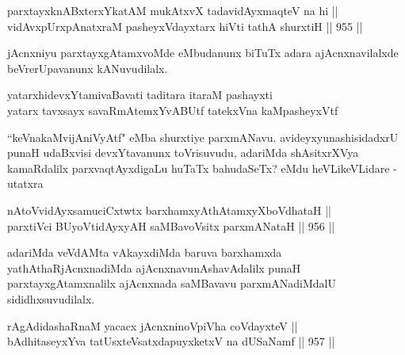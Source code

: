 \begin{shl}
parxtayxknABxterxYkatAM mukAtxvX tadavidAyxmaqteV na hi || \\
vidAvxpUrxpAnatxraM pasheyxVdayxtarx hiVti tathA shurxtiH \hfill || 955 ||  
\end{shl}

\begin{artha}
jAcnxniyu parxtayxgAtamxvoMde eMbudanunx biTuTx adara ajAcnxnavilalxde beVrerUpavanunx kANuvudilalx.
\end{artha}
	
\begin{shl}
yatarxhidevxYtamivaBavati taditara itaraM pashayxti \\
yatarx tavxsayx savaRmAtemxYvABUtf tatekxVna kaMpasheyxVtf
\end{shl}	
	
\begin{artha}
``keVnakaMvijAniVyAtf" eMba shurxtiye parxmANavu. avideyxyunashisidadxrU punaH udaBxvisi devxYtavanunx toVrisuvudu, adariMda shAsitxrXVya kamaRdalilx parxvaqtAyxdigaLu huTaTx bahudaSeTx? eMdu heVLikeVLidare - utatxra
\end{artha}

\begin{shl}
nAtoV\s vidAyxsamuciCxtwtx barxhamxyAthAtamxyXboVdhataH || \\
parxtiVci BUyoV\s tidAyxyAH saMBavoV\s sitx parxmANataH \hfill || 956 ||  
\end{shl}

\begin{artha}
adariMda veVdAMta vAkayxdiMda baruva barxhamxda yathAthaRjAcnxnadiMda ajAcnxnavunAshavAdalilx punaH parxtayxgAtamxnalilx ajAcnxnada saMBavavu parxmANadiMdalU sididhxsuvudilalx.
\end{artha}


\begin{shl}
rAgAdidashaRnaM yacacx jAcnxninoV\s piVha coVdayxteV || \\
\footnotemark[1]bAdhitaseyxYva tatUsxteVsatxdapuyxketxV na dUSaNamf \hfill || 957 ||  
\end{shl}

